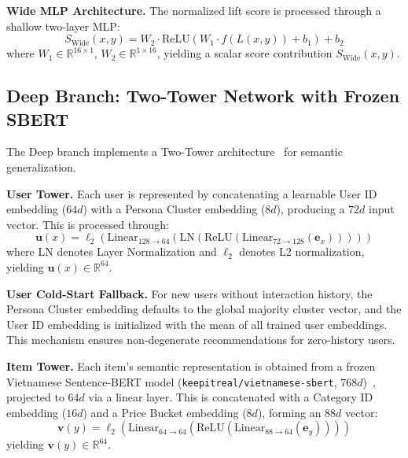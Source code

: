 \documentclass[10pt,conference]{IEEEtran}
\begin{document}
\textbf{Wide MLP Architecture.} The normalized lift score is processed through a shallow two-layer MLP:
\begin{equation}
S_{\text{Wide}}(x, y) = W_2 \cdot \text{ReLU}(W_1 \cdot f(L(x, y)) + b_1) + b_2
\label{eq:wide_mlp}
\end{equation}
where $W_1 \in \mathbb{R}^{16 \times 1}$, $W_2 \in \mathbb{R}^{1 \times 16}$, yielding a scalar score contribution $S_{\text{Wide}}(x, y)$.

\subsection{Deep Branch: Two-Tower Network with Frozen SBERT}
\label{subsec:deep_branch}

The Deep branch implements a Two-Tower architecture~\cite{yi2019sampling} for semantic generalization.

\textbf{User Tower.} Each user is represented by concatenating a learnable User ID embedding ($64d$) with a Persona Cluster embedding ($8d$), producing a $72d$ input vector. This is processed through:
\begin{equation}
\mathbf{u}(x) = \ell_2\!\left(\text{Linear}_{128 \to 64}\!\left(\text{LN}\!\left(\text{ReLU}\!\left(\text{Linear}_{72 \to 128}(\mathbf{e}_x)\right)\right)\right)\right)
\label{eq:user_tower}
\end{equation}
where LN denotes Layer Normalization and $\ell_2$ denotes L2 normalization, yielding $\mathbf{u}(x) \in \mathbb{R}^{64}$.

\textbf{User Cold-Start Fallback.} For new users without interaction history, the Persona Cluster embedding defaults to the global majority cluster vector, and the User ID embedding is initialized with the mean of all trained user embeddings. This mechanism ensures non-degenerate recommendations for zero-history users.

\textbf{Item Tower.} Each item's semantic representation is obtained from a frozen Vietnamese Sentence-BERT model (\texttt{keepitreal/vietnamese-sbert}, $768d$)~\cite{reimers2019sentence}, projected to $64d$ via a linear layer. This is concatenated with a Category ID embedding ($16d$) and a Price Bucket embedding ($8d$), forming an $88d$ vector:
\begin{equation}
\mathbf{v}(y) = \ell_2\!\left(\text{Linear}_{64 \to 64}\!\left(\text{ReLU}\!\left(\text{Linear}_{88 \to 64}(\mathbf{e}_y)\right)\right)\right)
\label{eq:item_tower}
\end{equation}
yielding $\mathbf{v}(y) \in \mathbb{R}^{64}$.
\end{document}
